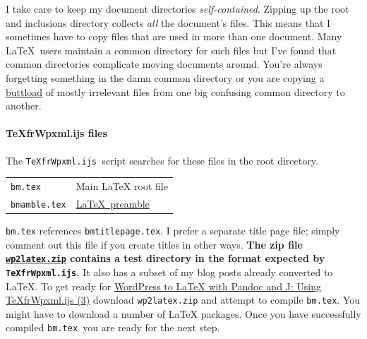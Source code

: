 I take care to keep my document directories \emph{self-contained}.
Zipping up the root and inclusions directory collects \emph{all} the
document's files. This means that I sometimes have to copy files that
are used in more than one document. Many \LaTeX\ users maintain a common
directory for such files but I've found that common directories
complicate moving documents around. You're always forgetting something
in the damn common directory or you are copying a
\href{http://www.urbandictionary.com/define.php?term=buttload}{buttload}
of mostly irrelevant files from one big confusing common directory to
another.

\paragraph{TeXfrWpxml.ijs files}

The \texttt{TeXfrWpxml.ijs~}script searches for these files in the root
directory.

\begin{center}
\begin{tabular}{lp{}} 
   \texttt{bm.tex}         & Main LaTeX root file  \\ 
   \texttt{bmamble.tex}    & \href{http://www.charlietanksley.net/philtex/my-idosyncratic-latex-preamble/}{\LaTeX\
preamble}            \\ 
\end{tabular}
\end{center}

\noindent\texttt{bm.tex} references \texttt{bmtitlepage.tex}. I prefer a separate
title page file; simply comment out this file if you create titles in
other ways. \textbf{The zip file
\href{http://www.box.com/s/nioua15kpdod5lvruaxe}{\texttt{wp2latex.zip}}
contains a test directory in the format expected by
\texttt{TeXfrWpxml.ijs}.} It also has a subset of my blog posts already
converted to \LaTeX. To get ready for
\href{http://bakerjd99.wordpress.com/2012/02/25/wordpress-to-latex-with-pandoc-and-j-using-texfrwpxml-ijs-part-3/}{WordPress
to LaTeX with Pandoc and J: Using TeXfrWpxml.ijs (3)} download
\texttt{wp2latex.zip} and attempt to compile \texttt{bm.tex}. You might
have to download a number of LaTeX packages. Once you have successfully
compiled \texttt{bm.tex~}you are ready for the next step.




%